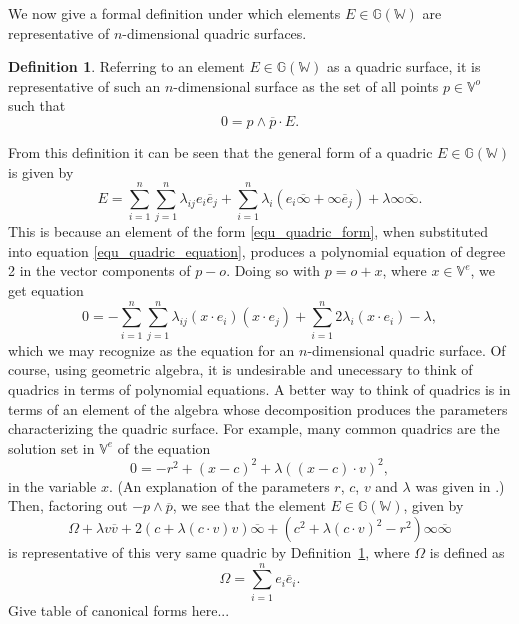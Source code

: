 \documentclass{birkjour}
\theoremstyle{definition}
\newtheorem{defn}[thm]{Definition}
\theoremstyle{remark}
\numberwithin{equation}{section}
\newcommand{\G}{\mathbb{G}}
\newcommand{\V}{\mathbb{V}}
\newcommand{\W}{\mathbb{W}}
\newcommand{\nvao}{o}
\newcommand{\nvai}{\infty}
\newcommand{\nvaib}{\overline{\infty}}
\begin{document}
We now give a formal definition under which elements $E\in\G(\W)$
are representative of $n$-dimensional quadric surfaces.
\begin{defn}\label{def_quadric}
Referring to an element $E\in\G(\W)$ as a quadric surface, it is representative of such an $n$-dimensional
surface as the set of all points $p\in\V^o$ such that
\begin{equation}\label{equ_quadric_equation}
0 = p\wedge\overline{p}\cdot E.
\end{equation}
\end{defn}
From this definition it can be seen that the general form of a quadric $E\in\G(\W)$ is given by
\begin{equation}\label{equ_quadric_form}
E = \sum_{i=1}^n\sum_{j=1}^n\lambda_{ij}e_i\overline{e}_j+
\sum_{i=1}^n\lambda_i(e_i\nvaib + \nvai\overline{e}_j)+
\lambda\nvai\nvaib.
\end{equation}
This is because an element of the form \eqref{equ_quadric_form}, when
substituted into equation \eqref{equ_quadric_equation}, produces a polynomial
equation of degree 2 in the vector components of $p-\nvao$.
Doing so with $p=\nvao+x$, where $x\in\V^e$, we get equation
\begin{equation}
0 = -\sum_{i=1}^n\sum_{j=1}^n\lambda_{ij}(x\cdot e_i)(x\cdot e_j)+
\sum_{i=1}^n 2\lambda_i(x\cdot e_i) - \lambda,
\end{equation}
which we may recognize as the equation for an $n$-dimensional quadric surface.
Of course, using geometric algebra, it is undesirable and unecessary to think of
quadrics in terms of polynomial equations.  A better way to think of quadrics is in terms
of an element of the algebra whose decomposition
produces the parameters characterizing the quadric surface.  For example, many common
quadrics are the solution set in $\V^e$ of the equation
\begin{equation}
0 = -r^2 + (x-c)^2 + \lambda((x-c)\cdot v)^2,
\end{equation}
in the variable $x$.  (An explanation of the parameters $r$, $c$, $v$ and $\lambda$
was given in \cite{Parkin12}.)  Then, factoring out $-p\wedge\overline{p}$, we see that
the element $E\in\G(\W)$, given by
\begin{equation}
\Omega + \lambda v\overline{v}+2(c+\lambda(c\cdot v)v)\nvaib+
(c^2+\lambda (c\cdot v)^2-r^2)\nvai\nvaib
\end{equation}
is representative of this very same quadric by Definition~\ref{def_quadric},
where $\Omega$ is defined as
\begin{equation}
\Omega = \sum_{i=1}^n e_i\overline{e}_i.
\end{equation}
Give table of canonical forms here...
\end{document}
